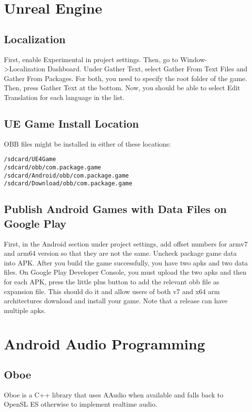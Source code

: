 \documentclass{article}
\begin{document}
\section{Unreal Engine}
\subsection{Localization}
First, enable Experimental in project settings. Then, go to Window->Localization Dashboard. Under Gather Text, select Gather From Text Files and Gather From Packages. For both, you need to specify the root folder of the game. Then, press Gather Text at the bottom. Now, you should be able to select Edit Translation for each language in the list. 

\subsection{UE Game Install Location}
OBB files might be installed in either of these locations: 
\begin{verbatim}
/sdcard/UE4Game
/sdcard/obb/com.package.game
/sdcard/Android/obb/com.package.game
/sdcard/Download/obb/com.package.game
\end{verbatim}

\subsection{Publish Android Games with Data Files on Google Play}
First, in the Android section under project settings, add offset numbers for armv7 and arm64 version so that they are not the same. Uncheck package game data into APK. After you build the game successfully, you have two apks and two data files. On Google Play Developer Console, you must upload the two apks and then for each APK, press the little plus button to add the relevant obb file as expansion file. This should do it and allow users of both v7 and x64 arm architectures download and install your game. Note that a release can have multiple apks. 

\section{Android Audio Programming}
\subsection{Oboe}
Oboe is a C++ library that uses AAudio when available and falls back to OpenSL ES otherwise to implement realtime audio. 
\end{document}
